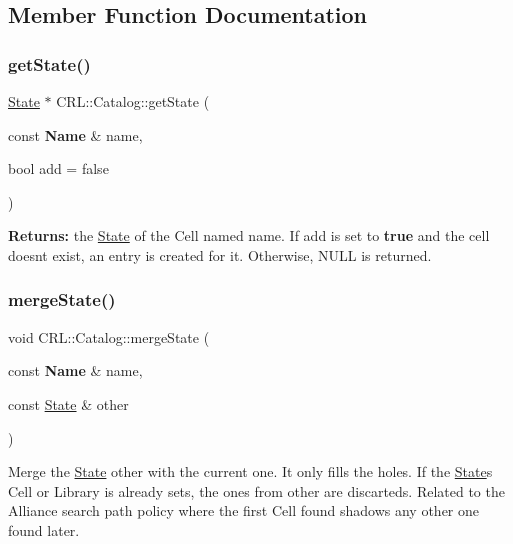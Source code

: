 \subsection{Member Function Documentation}
\mbox{\label{classCRL_1_1Catalog_a5b04db2b2179d70212dd1b12daa903f9}} 
\subsubsection{\texorpdfstring{get\+State()}{getState()}}
{\footnotesize\ttfamily \mbox{\hyperlink{classCRL_1_1Catalog_1_1State}{State}} $\ast$ C\+R\+L\+::\+Catalog\+::get\+State (\begin{DoxyParamCaption}\item[{const \textbf{ Name} \&}]{name,  }\item[{bool}]{add = {\ttfamily false} }\end{DoxyParamCaption})}

{\bfseries Returns\+:} the \mbox{\hyperlink{classCRL_1_1Catalog_1_1State}{State}} of the Cell named {\ttfamily name}. If {\ttfamily add} is set to {\bfseries true} and the cell doesn\textquotesingle{}t exist, an entry is created for it. Otherwise, N\+U\+LL is returned. \mbox{\label{classCRL_1_1Catalog_afe3ea2153684ed8df029ee896cef6608}} 
\subsubsection{\texorpdfstring{merge\+State()}{mergeState()}}
{\footnotesize\ttfamily void C\+R\+L\+::\+Catalog\+::merge\+State (\begin{DoxyParamCaption}\item[{const \textbf{ Name} \&}]{name,  }\item[{const \mbox{\hyperlink{classCRL_1_1Catalog_1_1State}{State}} \&}]{other }\end{DoxyParamCaption})}

Merge the \mbox{\hyperlink{classCRL_1_1Catalog_1_1State}{State}} {\ttfamily other} with the current one. It only fills the holes. If the \mbox{\hyperlink{classCRL_1_1Catalog_1_1State}{State}}\textquotesingle{}s Cell or Library is already sets, the ones from {\ttfamily other} are discarteds. Related to the Alliance search path policy where the first Cell found shadows any other one found later. \mbox{\label{classCRL_1_1Catalog_ada5b55e7926764fc9c7f5b7d4e6c2cdc}} 
